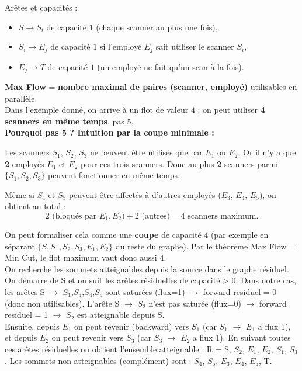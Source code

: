 Arêtes et capacités :
\begin{itemize}
    \item $S \rightarrow S_i$ de capacité $1$ \quad (chaque scanner au plus une fois),
    \item $S_i \rightarrow E_j$ de capacité $1$ si l’employé $E_j$ sait utiliser le scanner $S_i$,
    \item $E_j \rightarrow T$ de capacité $1$ \quad (un employé ne fait qu’un scan à la fois). \\
\end{itemize}

\textbf{Max Flow} = \textbf{nombre maximal de paires (scanner, employé)} utilisables en parallèle. \\

Dans l’exemple donné, on arrive à un flot de valeur $4$ : on peut utiliser \textbf{4 scanners en même temps}, pas 5. \\

\textbf{Pourquoi pas 5 ? Intuition par la coupe minimale :}

Les scanners $S_1$, $S_2$, $S_3$ ne peuvent être utilisés que par $E_1$ ou $E_2$.  
Or il n’y a que \textbf{2} employés $E_1$ et $E_2$ pour ces trois scanners.  
Donc au plus \textbf{2} scanners parmi $\{S_1,S_2,S_3\}$ peuvent fonctionner en même temps.

Même si $S_4$ et $S_5$ peuvent être affectés à d’autres employés ($E_3$, $E_4$, $E_5$), on obtient au total :
\[
2 \text{ (bloqués par } E_1,E_2) + 2 \text{ (autres)} = 4 \text{ scanners maximum.}
\]

On peut formaliser cela comme une \textbf{coupe} de capacité $4$ (par exemple en séparant $\{S, S_1, S_2, S_3, E_1, E_2\}$ du reste du graphe).  
Par le théorème Max Flow = Min Cut, le flot maximum vaut donc aussi $4$. \\

On recherche les sommets atteignables depuis la source dans le graphe résiduel. On démarre de S et on suit les arêtes résiduelles de capacité > 0. Dans notre cas, les arêtes S $\rightarrow$ $S_1$,$S_3$,$S_4$,$S_5$ sont saturées (flux=1) $\rightarrow$ forward residuel = 0 (donc non utilisables). L’arête S $\rightarrow$ $S_2$ n’est pas saturée (flux=0) $\rightarrow$ forward residuel = 1 $\rightarrow$ $S_2$ est atteignable depuis S. \\

Ensuite, depuis $E_1$ on peut revenir (backward) vers $S_1$ (car $S_1$ $\rightarrow$ $E_1$ a flux 1), et depuis $E_2$ on peut revenir vers $S_3$ (car $S_3$ $\rightarrow$ $E_2$ a flux 1). En suivant toutes ces arêtes résiduelles on obtient l’ensemble atteignable : R = {S, $S_2$, $E_1$, $E_2$, $S_1$, $S_3$}.
Les sommets non atteignables (complément) sont : {$S_4$, $S_5$, $E_3$, $E_4$, $E_5$, T}. \\

